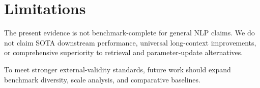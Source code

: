 \section{Limitations}
The present evidence is not benchmark-complete for general NLP claims. We do not claim SOTA downstream performance, universal long-context improvements, or comprehensive superiority to retrieval and parameter-update alternatives.

To meet stronger external-validity standards, future work should expand benchmark diversity, scale analysis, and comparative baselines.
